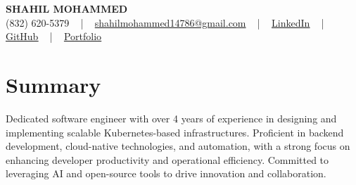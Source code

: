 \documentclass[letterpaper,10pt]{article}
\begin{document}
\begin{center}
    {\fontsize{14pt}{12pt}\selectfont \textbf{\MakeUppercase{Shahil Mohammed}}}\\ \vspace{2pt}
    \fontsize{10pt}{12pt}\selectfont (832) 620-5379 ~ | ~ \href{mailto:shahilmohammed14786@gmail.com}{shahilmohammed14786@gmail.com} ~ | ~  
    \href{https://www.linkedin.com/in/shahil-mohammed-9652931a1/}{\color{blue}\underline{LinkedIn}}  ~ | ~ 
    \href{https://github.com/freakbeast14}{\color{blue}\underline{GitHub}} ~ | ~ 
    \href{https://shahil-mohammed.netlify.app/}{\color{blue}\underline{Portfolio}}
    \vspace{-8pt}
\end{center}

\section{Summary}
\vspace{-2pt}\fontsize{8pt}{9pt}\selectfont
Dedicated software engineer with over 4 years of experience in designing and implementing scalable Kubernetes-based infrastructures. Proficient in backend development, cloud-native technologies, and automation, with a strong focus on enhancing developer productivity and operational efficiency. Committed to leveraging AI and open-source tools to drive innovation and collaboration.

\vspace{-5pt}
 
\vspace{-2pt}
\end{document}
